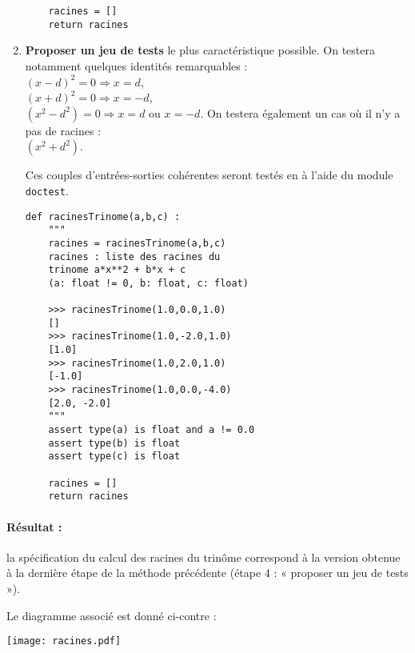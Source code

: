 \begin{enumerate}
\begin{minipage}[t]{9cm}
\begin{lstlisting}
    racines = []
    return racines
\end{lstlisting}
\end{minipage}
\vspace*{1mm}

\item 
\begin{minipage}[t]{6cm}
\textbf{Proposer un jeu de tests}
le plus caractéristique possible.
On testera notamment quelques identités remarquables :\\
$(x-d)^2 = 0 \Rightarrow x = d$, \\
$(x+d)^2 = 0 \Rightarrow x = -d$, \\
$(x^2 - d^2) = 0 \Rightarrow x = d$ ou $x = -d$. 
On testera également un cas où il n'y a pas de racines :\\
$(x^2 + d^2)$.

Ces couples d'entrées-sorties cohérentes seront testés en \python{}
à l'aide du module \texttt{doctest}.
\end{minipage}
\hfill
\begin{minipage}[t]{9cm}\footnotesize
\begin{lstlisting}
def racinesTrinome(a,b,c) :
    """
    racines = racinesTrinome(a,b,c)
    racines : liste des racines du 
    trinome a*x**2 + b*x + c
    (a: float != 0, b: float, c: float)
    
    >>> racinesTrinome(1.0,0.0,1.0)
    []
    >>> racinesTrinome(1.0,-2.0,1.0)
    [1.0]
    >>> racinesTrinome(1.0,2.0,1.0)
    [-1.0]
    >>> racinesTrinome(1.0,0.0,-4.0)
    [2.0, -2.0]
    """
    assert type(a) is float and a != 0.0
    assert type(b) is float
    assert type(c) is float
    
    racines = []
    return racines
\end{lstlisting}
\end{minipage}

\end{enumerate}

\vspace*{2mm}

\paragraph{Résultat :} la spécification \python{} du calcul des racines
du trinôme correspond à la version obtenue à la dernière étape de la 
méthode précédente
(étape 4 : « proposer un jeu de tests »).

\noindent\begin{minipage}{5cm}
Le diagramme \uml{} associé est donné ci-contre :
\end{minipage}
\hfill
\begin{minipage}{10cm}
\texttt{[image: racines.pdf]}
\end{minipage}

